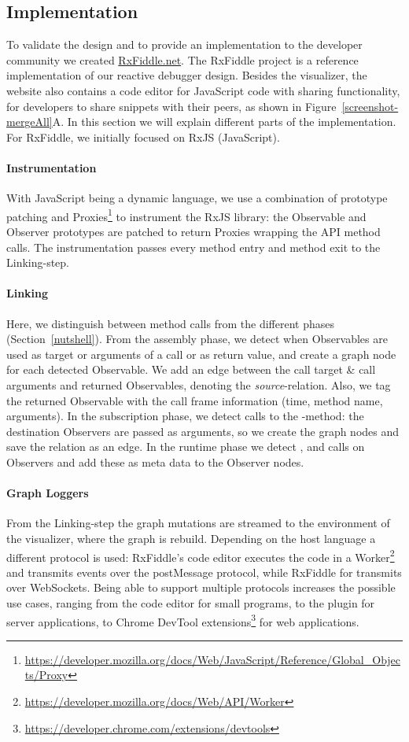 \subsection{Implementation}
To validate the design and to provide an implementation to the developer community we created \url{RxFiddle.net}. The RxFiddle project is a reference implementation of 
our reactive debugger design. Besides the visualizer, the website also contains a code editor for JavaScript code with sharing functionality, for developers to share snippets with their peers, as shown in Figure~\ref{screenshot-mergeAll}A. In this section we will explain different parts of the implementation. For RxFiddle, we initially focused on RxJS (JavaScript).

\paragraph{Instrumentation}
With JavaScript being a dynamic language, we use a combination of prototype patching and Proxies\footnote{\url{https://developer.mozilla.org/docs/Web/JavaScript/Reference/Global_Objects/Proxy}} to instrument the RxJS library: the Observable and Observer prototypes are patched to return Proxies wrapping the API method calls. The instrumentation passes every method entry and method exit to the Linking-step.

\paragraph{Linking}
Here, we distinguish between method calls from the different phases (Section~\ref{nutshell}). From the assembly phase, we detect when Observables are used as target or arguments of a call or as return value, and create a graph node for each detected Observable. We add an edge between the call target \& call arguments and returned Observables, denoting the \emph{source}-relation. Also, we tag the returned Observable with the call frame information (time, method name, arguments). In the subscription phase, we detect calls to the -method: the destination Observers are passed as arguments, so we create the graph nodes and save the relation as an edge. In the runtime phase we detect ,  and  calls on Observers and add these as meta data to the Observer nodes.

\paragraph{Graph Loggers}
From the Linking-step the graph mutations are streamed to the environment of the visualizer, where the graph is rebuild. Depending on the host language a different protocol is used: RxFiddle's code editor executes the code in a Worker\footnote{\url{https://developer.mozilla.org/docs/Web/API/Worker}} and transmits events over the postMessage protocol, while RxFiddle for \NodeJS{} transmits over WebSockets. Being able to support multiple protocols increases the possible use cases, ranging from the code editor for small programs, to the \NodeJS{} plugin for server applications, to Chrome DevTool extensions\footnote{\url{https://developer.chrome.com/extensions/devtools}} for web applications.

